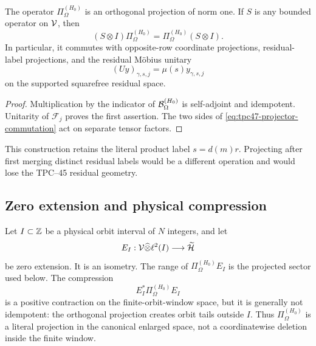 \begin{proposition}
\label{prop:tpc47-projector-structure}
The operator \(\Pi_{\Omega}^{(H_0)}\) is an orthogonal projection of
norm one.  If \(S\) is any bounded operator on \(\mathcal V\), then
\begin{equation}
 (S\otimes I)\Pi_{\Omega}^{(H_0)}
 =\Pi_{\Omega}^{(H_0)}(S\otimes I).
 \label{eq:tpc47-projector-commutation}
\end{equation}
In particular, it commutes with opposite-row coordinate projections,
residual-label projections, and the residual M\"obius unitary
\begin{equation}
 (Uy)_{\gamma,s,j}=\mu(s)y_{\gamma,s,j}
 \label{eq:tpc47-residual-unitary}
\end{equation}
on the supported squarefree residual space.
\end{proposition}

\begin{proof}
Multiplication by the indicator of
\(\mathcal B_{\Omega}^{(H_0)}\) is self-adjoint and idempotent.  Unitarity of
\(\mathscr F_j\) proves the first assertion.  The two sides of
\eqref{eq:tpc47-projector-commutation} act on separate tensor factors.
\end{proof}

This construction retains the literal product label \(s=d(m)r\).
Projecting after first merging distinct residual labels would be a
different operation and would lose the TPC--45 residual geometry.

\subsection{Zero extension and physical compression}

Let \(I\subset\mathbb Z\) be a physical orbit interval of \(N\) integers, and
let
\begin{equation}
 E_I:\mathcal V\widehat\otimes\ell^2(I)\longrightarrow\widetilde{\mathcal H}
 \label{eq:tpc47-zero-extension}
\end{equation}
be zero extension.  It is an isometry.  The range of
\(\Pi_{\Omega}^{(H_0)}E_I\) is the projected sector used below.
The compression
\begin{equation}
 E_I^*\Pi_{\Omega}^{(H_0)}E_I
 \label{eq:tpc47-compressed-projector}
\end{equation}
is a positive contraction on the finite-orbit-window space, but
it is generally not idempotent: the orthogonal projection creates orbit
tails outside \(I\).  Thus \(\Pi_{\Omega}^{(H_0)}\) is a literal
projection in the canonical enlarged space, not a coordinatewise
deletion inside the finite window.

